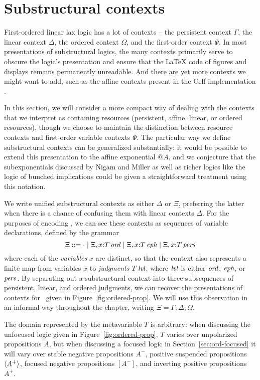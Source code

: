 \section{Substructural contexts}
\label{sec:contexts}

First-ordered linear lax logic has a lot of contexts -- the persistent
context $\Gamma$, the linear context $\Delta$, the ordered context
$\Omega$, and the first-order context $\Psi$. In most presentations
of substructural logics, the many
contexts primarily serve to obscure the logic's presentation
and ensure that the {\LaTeX} code of figures and displays remains
permanently unreadable. And there are yet more contexts we might want to 
add, such as the affine contexts present in the Celf implementation
\cite{schacknielsen08celf}.

In this section, we will consider a more compact way of dealing with
the contexts that we interpret as containing resources (persistent,
affine, linear, or ordered resources), though we choose to maintain
the distinction between resource contexts and first-order variable
contexts $\Psi$.  The particular way we define substructural contexts
can be generalized substantially: it would be possible to extend this
presentation to the affine exponential ${@}A$, and we conjecture that
the subexponentials discussed by Nigam and Miller
\cite{nigam09algorithmic} as well as richer logics like the logic of
bunched implications \cite{pym02semantics} could be given a
straightforward treatment using this notation.

We write unified substructural contexts as either $\Delta$ or $\Xi$,
preferring the latter when there is a chance of confusing them with
linear contexts $\Delta$. For the purposes of encoding \ollll, we can
see these contexts as sequences of variable declarations, defined by
the grammar
\[
\Xi ::= \cdot 
  \mid \Xi, x{:}{T}\,{{\it ord}}
  \mid \Xi, x{:}{T}\,{{\it eph}}
  \mid \Xi, x{:}{T}\,{{\it pers}}
\]
where each of the {\em variables} $x$ are distinct, so that the
context also represents a finite map from variables $x$ to {\it
  judgments} ${T}\,{{\it lvl}}$, where ${\it lvl}$ is either ${\it ord}$, ${\it eph}$,
or ${\it pers}$.  By separating out a substructural context into three
subsequences of persistent, linear, and ordered judgments, we can
recover the presentations of contexts for \ollll~given in
Figure~\ref{fig:ordered-prop}. We will use this observation in an
informal way throughout the chapter, writing $\Xi = \Gamma; \Delta;
\Omega$.

The domain represented by the metavariable $T$ is arbitrary: when
discussing the unfocused logic given in Figure~\ref{fig:ordered-prop},
$T$ varies over unpolarized propositions $A$, but when discussing a
focused logic in Section~\ref{sec:ord-focused} it will vary over
stable negative propositions $A^-$, positive suspended propositions
$\langle {A^+} \rangle$, focused negative propositions $[A^-]$, and inverting
positive propositions $A^+$.



